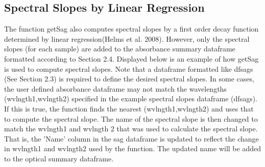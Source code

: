 \documentclass[a4paper,11pt]{article}\usepackage[]{graphicx}\usepackage[]{color}
\begin{document}
\subsection{Spectral Slopes by Linear Regression}
The function getSag also computes spectral slopes by a first order decay function determined by linear regression(Helms et al. 2008). However, only the spectral slopes (for each sample) are added to the absorbance summary dataframe formatted according to Section 2.4. Displayed below is an example of how getSag is used to compute spectral slopes. Note that a dataframe formatted like dfsags (See Section 2.3) is required to define the desired spectral slopes. In some cases, the user defined absorbance dataframe may not match the wavelengths (wvlngth1,wvlngth2) specified in the example spectral slopes dataframe (dfsags). If this is true, the function finds the nearest (wvlngth1,wvlngth2) and uses that to compute the spectral slope. The name of the spectral slope is then changed to match the wvlngth1 and wvlngth 2 that was used to calculate the spectral slope. That is, the 'Name' column in the sag dataframe is updated to reflect the change in wvlngth1 and wvlngth2 used by the function. The updated name will be added to the optical summary dataframe.
\end{document}
